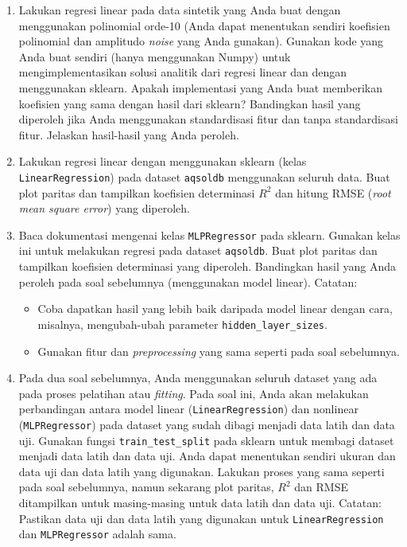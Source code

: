 \documentclass[a4paper,11pt]{article} %
\newcommand{\pyinline}[1]{\texttt{#1}}
\begin{document}
\begin{enumerate}
%
%
\item Lakukan regresi linear pada data sintetik yang Anda buat dengan
menggunakan polinomial orde-10 (Anda dapat menentukan sendiri koefisien
polinomial dan amplitudo \textit{noise} yang Anda gunakan).
Gunakan kode yang Anda buat sendiri (hanya menggunakan Numpy)
untuk mengimplementasikan
solusi analitik dari regresi linear dan dengan menggunakan sklearn.
Apakah implementasi yang Anda buat memberikan
koefisien yang sama dengan hasil dari sklearn? Bandingkan hasil yang diperoleh
jika Anda menggunakan standardisasi fitur dan tanpa standardisasi fitur. Jelaskan
hasil-hasil yang Anda peroleh.
%
%
\item Lakukan regresi linear dengan menggunakan sklearn (kelas
\pyinline{LinearRegression}) pada dataset
\texttt{aqsoldb} menggunakan seluruh data. Buat plot paritas dan tampilkan
koefisien determinasi $R^{2}$ dan hitung RMSE (\textit{root mean square error})
yang diperoleh.
%
%
\item Baca dokumentasi mengenai kelas \texttt{MLPRegressor} pada sklearn.
Gunakan kelas ini untuk melakukan regresi pada dataset \texttt{aqsoldb}.
Buat plot paritas dan tampilkan
koefisien determinasi yang diperoleh. Bandingkan hasil yang Anda peroleh pada soal
sebelumnya (menggunakan model linear).
Catatan:
  \begin{itemize}
  \item Coba dapatkan hasil yang lebih baik daripada model linear dengan
  cara, misalnya, mengubah-ubah parameter \pyinline{hidden_layer_sizes}.
  \item Gunakan fitur dan \textit{preprocessing} yang sama seperti pada
  soal sebelumnya.
  \end{itemize}
%
%
\item Pada dua soal sebelumnya, Anda menggunakan seluruh dataset yang ada pada
proses pelatihan atau \textit{fitting}.
Pada soal ini, Anda akan melakukan perbandingan antara model linear
(\pyinline{LinearRegression}) dan nonlinear (\pyinline{MLPRegressor}) pada
dataset yang sudah dibagi menjadi data latih dan data uji. Gunakan
fungsi \pyinline{train_test_split} pada sklearn untuk membagi dataset menjadi
data latih dan data uji. Anda dapat menentukan sendiri ukuran dan data uji dan
data latih yang digunakan. Lakukan proses yang sama seperti pada soal sebelumnya,
namun sekarang plot paritas, $R^{2}$ dan RMSE ditampilkan untuk
masing-masing untuk data latih dan data uji.
Catatan: Pastikan data uji dan data latih yang digunakan
untuk \pyinline{LinearRegression} dan \pyinline{MLPRegressor} adalah sama.

\end{enumerate}
\end{document}
